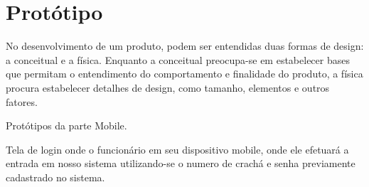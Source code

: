 \chapter{Protótipo}
No desenvolvimento de um produto, podem ser entendidas
duas formas de design: a conceitual e a física. Enquanto a
conceitual preocupa-se em estabelecer bases que permitam o
entendimento do comportamento e finalidade do produto, a
física procura estabelecer detalhes de design, como tamanho,
elementos e outros fatores.\cite{medeiros2013importancia}

\newpage
\begin{center}
	Protótipos da parte Mobile.
\end{center}

Tela de login onde o funcionário em seu dispositivo mobile, onde ele efetuará a entrada em nosso sistema utilizando-se o numero de crachá e senha previamente cadastrado no sistema.


